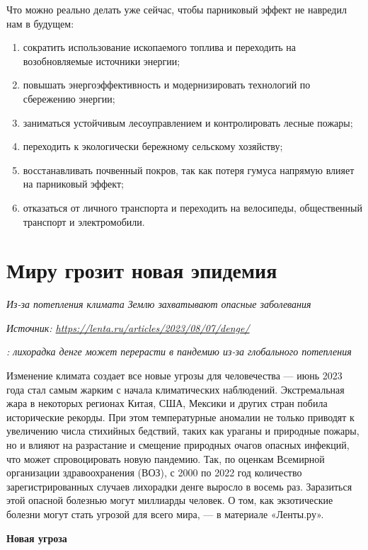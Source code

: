 Что можно реально делать уже сейчас, чтобы парниковый эффект не навредил нам в будущем:
\begin{enumerate}
    \item сократить использование ископаемого топлива и переходить на возобновляемые источники энергии;
    \item повышать энергоэффективность и модернизировать технологий по сбережению энергии;
    \item заниматься устойчивым лесоуправлением и контролировать лесные пожары;
    \item переходить к экологически бережному сельскому хозяйству;
    \item восстанавливать почвенный покров, так как потеря гумуса напрямую влияет на парниковый эффект;
    \item отказаться от личного транспорта и переходить на велосипеды, общественный транспорт и электромобили.
\end{enumerate}



\newpage
\section{Миру грозит новая эпидемия}

\textit{Из-за потепления климата Землю захватывают опасные заболевания}

\textit{Источник: \url{https://lenta.ru/articles/2023/08/07/denge/}}

\textit{: лихорадка денге может перерасти в пандемию из-за глобального потепления}

Изменение климата создает все новые угрозы для человечества --- июнь 2023 года стал самым жарким с начала климатических наблюдений. Экстремальная жара в некоторых регионах Китая, США, Мексики и других стран побила исторические рекорды. При этом температурные аномалии не только приводят к увеличению числа стихийных бедствий, таких как ураганы и природные пожары, но и влияют на разрастание и смещение природных очагов опасных инфекций, что может спровоцировать новую пандемию. Так, по оценкам Всемирной организации здравоохранения (ВОЗ), с 2000 по 2022 год количество зарегистрированных случаев лихорадки денге выросло в восемь раз. Заразиться этой опасной болезнью могут миллиарды человек. О том, как экзотические болезни могут стать угрозой для всего мира, --- в материале «Ленты.ру».

\textbf{Новая угроза}

